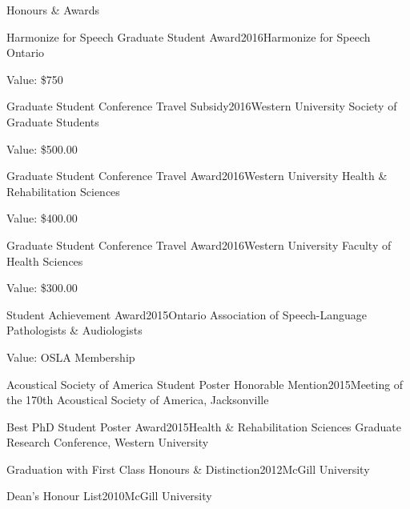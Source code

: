 \documentclass{resume} %
\begin{document}
\begin{rSection}{Honours \& Awards}
\begin{rSubsection}{Harmonize for Speech Graduate Student Award}{2016}{Harmonize for Speech Ontario}{}
\item Value: \$750
\end{rSubsection}

\begin{rSubsection}{Graduate Student Conference Travel Subsidy}{2016}{Western University Society of Graduate Students}{}
\item Value: \$500.00
\end{rSubsection}

\begin{rSubsection}{Graduate Student Conference Travel Award}{2016}{Western University Health \& Rehabilitation Sciences}{}
\item Value: \$400.00
\end{rSubsection}

\begin{rSubsection}{Graduate Student Conference Travel Award}{2016}{Western University Faculty of Health Sciences}{}
\item Value: \$300.00
\end{rSubsection}

\begin{rSubsection}{Student Achievement Award}{2015}{Ontario Association of Speech-Language Pathologists \&
Audiologists}{}
\item Value: OSLA Membership
\end{rSubsection}

\begin{rSubsection}{Acoustical Society of America Student Poster Honorable Mention}{2015}{Meeting of the 170th Acoustical Society of America, Jacksonville}{}
\end{rSubsection}

\begin{rSubsection}{Best PhD Student Poster Award}{2015}{Health \& Rehabilitation Sciences Graduate Research Conference, Western University}{}
\end{rSubsection}


\begin{rSubsection}{Graduation with First Class Honours \& Distinction}{2012}{McGill University}{ }
\end{rSubsection}

\begin{rSubsection}{Dean's Honour List}{2010}{McGill University}{}
\end{rSubsection}


\end{rSection}
\end{document}
